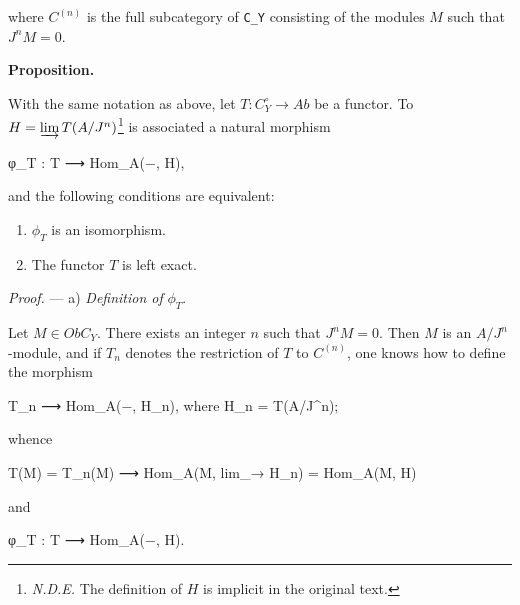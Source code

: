 \documentclass[
]{article}
\newenvironment{Shaded}{}{}
\newcommand{\NormalTok}[1]{#1}
\providecommand{\tightlist}{%
  \setlength{\itemsep}{0pt}\setlength{\parskip}{0pt}}
\begin{document}
where \(C^{(n)}\) is the full subcategory of \texttt{C\_Y} consisting of
the modules \(M\) such that \(J^{n} M = 0\).

\textbf{Proposition.}

With the same notation as above, let \(T : C^{\circ}_{Y} \to Ab\) be a
functor. To \(H = \varinjlim T(A/J^{n})\)\footnote{\emph{N.D.E.} The
  definition of \(H\) is implicit in the original text.} is associated a
natural morphism

\begin{Shaded}
\begin{Highlighting}[]
\NormalTok{φ\_T : T ⟶ Hom\_A(−, H),}
\end{Highlighting}
\end{Shaded}

and the following conditions are equivalent:

\begin{enumerate}
\def\labelenumi{\arabic{enumi}.}
\tightlist
\item
  \(\phi_{T}\) is an isomorphism.
\item
  The functor \(T\) is left exact.
\end{enumerate}

\emph{Proof.} --- a) \emph{Definition of} \(\phi_{T}\).

Let \(M \in Ob C_{Y}\). There exists an integer \(n\) such that
\(J^{n} M = 0\). Then \(M\) is an \(A/J^{n}\)-module, and if \(T_{n}\)
denotes the restriction of \(T\) to \(C^{(n)}\), one knows how to define
the morphism

\begin{Shaded}
\begin{Highlighting}[]
\NormalTok{T\_n ⟶ Hom\_A(−, H\_n),    where H\_n = T(A/J\^{}n);}
\end{Highlighting}
\end{Shaded}

whence

\begin{Shaded}
\begin{Highlighting}[]
\NormalTok{T(M) = T\_n(M) ⟶ Hom\_A(M, lim\_→ H\_n) = Hom\_A(M, H)}
\end{Highlighting}
\end{Shaded}

and

\begin{Shaded}
\begin{Highlighting}[]
\NormalTok{φ\_T : T ⟶ Hom\_A(−, H).}
\end{Highlighting}
\end{Shaded}
\end{document}
